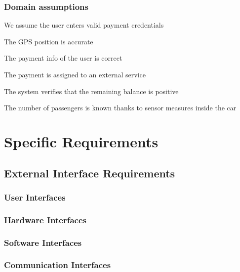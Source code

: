 \documentclass[11pt,a4paper]{report}
\begin{document}
\subsection{Domain assumptions}
\begin{DA}
	\item We assume the user enters valid payment credentials
	\item The GPS position is accurate
	\item The payment info of the user is correct
	\item The payment is assigned to an external service
	\item The system verifies that the remaining balance is positive
	\item The number of passengers is known thanks to sensor measures inside the car
\end{DA}
\chapter{Specific Requirements}
\section{External Interface Requirements}
\subsection{User Interfaces}
\subsection{Hardware Interfaces}
\subsection{Software Interfaces}
\subsection{Communication Interfaces}
\end{document}
